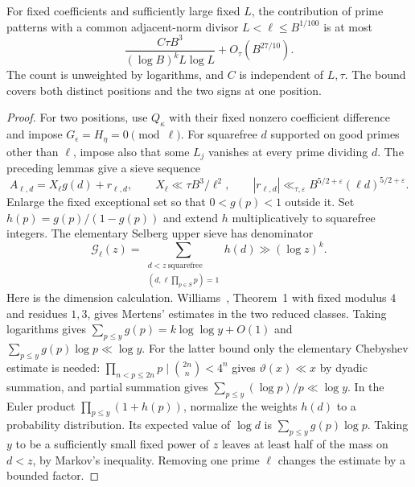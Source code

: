 \begin{lemma}\label{lem:v5-medium-sieve}
For fixed coefficients and sufficiently large fixed $L$, the contribution
of prime patterns with a common adjacent-norm divisor
$L<\ell\leq B^{1/100}$ is at most
\begin{equation}\label{eq:v5-medium-sieve}
 \frac{C\tau B^3}{(\log B)^k L\log L}+O_\tau(B^{27/10}).
\end{equation}
The count is unweighted by logarithms, and $C$ is independent of $L,\tau$.
The bound covers both distinct positions and the two signs at one position.
\end{lemma}
\begin{proof}
For two positions, use $Q_\kappa$ with their fixed nonzero coefficient
difference and impose $G_\epsilon=H_\eta=0\pmod\ell$.
For squarefree $d$ supported on good primes other than $\ell$, impose also
that some $L_j$ vanishes at every prime dividing $d$. The preceding lemmas
give a sieve sequence
\[
 A_{\ell,d}=X_\ell g(d)+r_{\ell,d},\qquad
 X_\ell\ll\tau B^3/\ell^2,\qquad
 |r_{\ell,d}|\ll_{\tau,\varepsilon}
 B^{5/2+\varepsilon}(\ell d)^{5/2+\varepsilon}.
\]
Enlarge the fixed exceptional set so that $0<g(p)<1$ outside it.
Set $h(p)=g(p)/(1-g(p))$ and extend $h$ multiplicatively to squarefree
integers. The elementary Selberg upper sieve has denominator
\[
 \mathcal G_\ell(z)=\sum_{\substack{d<z\ \text{squarefree}\\
                         (d,\ell\prod_{p\in S}p)=1}}h(d)
 \gg (\log z)^k.
\]
Here is the dimension calculation. Williams~\cite{v5williams}, Theorem~1
with fixed modulus $4$ and residues $1,3$, gives Mertens' estimates in the
two reduced classes. Taking logarithms gives
$\sum_{p\leq y}g(p)=k\log\log y+O(1)$ and
$\sum_{p\leq y}g(p)\log p\ll\log y$.
For the latter bound only the elementary Chebyshev estimate is needed:
$\prod_{n<p\leq2n}p\mid\binom{2n}{n}<4^n$ gives
$\vartheta(x)\ll x$ by dyadic summation, and partial summation gives
$\sum_{p\leq y}(\log p)/p\ll\log y$.
In the Euler product $\prod_{p\leq y}(1+h(p))$, normalize the weights
$h(d)$ to a probability distribution. Its expected value of $\log d$ is
$\sum_{p\leq y}g(p)\log p$. Taking $y$ to be a sufficiently small fixed
power of $z$ leaves at least half of the mass on $d<z$, by Markov's
inequality. Removing one prime $\ell$ changes the estimate by a bounded
factor.


\end{proof}
